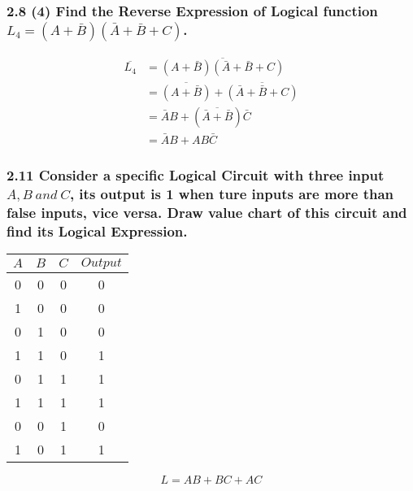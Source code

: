     \subsubsection{2.8 (4) \textnormal{Find the Reverse Expression of Logical function $L_4=(A+\bar{B})(\bar{A}+\bar{B}+C)$}.}
    {\color{hwSolution}
        \begin{align*}
            \overline{L_4} 
            &= \overline{(A+\bar{B})(\bar{A}+\bar{B}+C)}\\
            &= \overline{(A+\bar{B})}+\overline{(\bar{A}+\bar{B}+C)}\\
            &= \bar{A}B+(\overline{\bar{A}+\bar{B}})\bar{C}\\
            &= \bar{A}B+AB\bar{C}
        \end{align*}
    }
    \subsubsection{2.11 \textnormal{Consider a specific Logical Circuit with three input $A,B~and~C$, its output is 1 when ture inputs are more than false inputs, vice versa. Draw value chart of this circuit and find its Logical Expression}.}
    {\color{hwSolution}
        \begin{center}
            \begin{tabular}{c c c|c}
                $A$ & $B$ & $C$ & $Output$ \\
                \hline
                0   & 0   & 0   & 0 \\
                1   & 0   & 0   & 0 \\
                0   & 1   & 0   & 0 \\
                1   & 1   & 0   & 1 \\
                0   & 1   & 1   & 1 \\
                1   & 1   & 1   & 1 \\
                0   & 0   & 1   & 0 \\
                1   & 0   & 1   & 1 \\
            \end{tabular}
            \[L = AB + BC + AC\]
        \end{center}
    }
